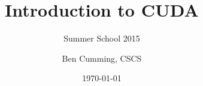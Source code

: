\documentclass[aspectratio=43]{beamer}
\author{Ben Cumming, CSCS}
\title{Introduction to CUDA}
\subtitle{Summer School 2015}
\date{\today}
\begin{document}
\cscstitle








%
\end{document}
